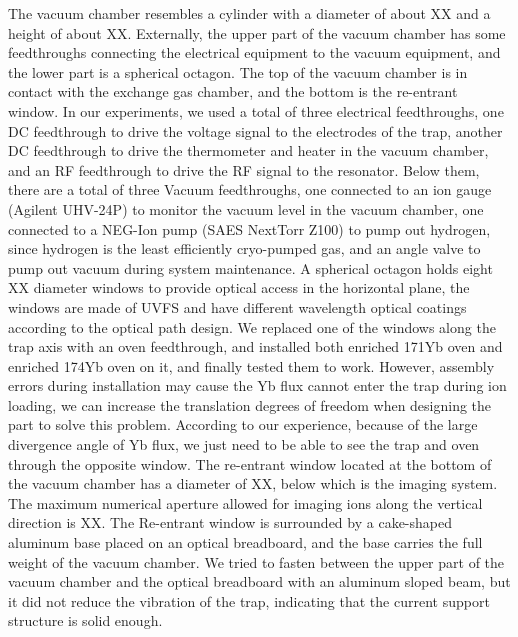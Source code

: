 The vacuum chamber resembles a cylinder with a diameter of about XX and a height of about XX. Externally, the upper part of the vacuum chamber has some feedthroughs connecting the electrical equipment to the vacuum equipment, and the lower part is a spherical octagon. The top of the vacuum chamber is in contact with the exchange gas chamber, and the bottom is the re-entrant window. In our experiments, we used a total of three electrical feedthroughs, one DC feedthrough to drive the voltage signal to the electrodes of the trap, another DC feedthrough to drive the thermometer and heater in the vacuum chamber, and an RF feedthrough to drive the RF signal to the resonator. Below them, there are a total of three Vacuum feedthroughs, one connected to an ion gauge (Agilent UHV-24P) to monitor the vacuum level in the vacuum chamber, one connected to a NEG-Ion pump (SAES NextTorr Z100) to pump out hydrogen, since hydrogen is the least efficiently cryo-pumped gas, and an angle valve to pump out vacuum during system maintenance. A spherical octagon holds eight XX diameter windows to provide optical access in the horizontal plane, the windows are made of UVFS and have different wavelength optical coatings according to the optical path design. We replaced one of the windows along the trap axis with an oven feedthrough, and installed both enriched 171Yb oven and enriched 174Yb oven on it, and finally tested them to work. However, assembly errors during installation may cause the Yb flux cannot enter the trap during ion loading, we can increase the translation degrees of freedom when designing the part to solve this problem. According to our experience, because of the large divergence angle of Yb flux, we just need to be able to see the trap and oven through the opposite window. The re-entrant window located at the bottom of the vacuum chamber has a diameter of XX, below which is the imaging system. The maximum numerical aperture allowed for imaging ions along the vertical direction is XX. The Re-entrant window is surrounded by a cake-shaped aluminum base placed on an optical breadboard, and the base carries the full weight of the vacuum chamber. We tried to fasten between the upper part of the vacuum chamber and the optical breadboard with an aluminum sloped beam, but it did not reduce the vibration of the trap, indicating that the current support structure is solid enough.
